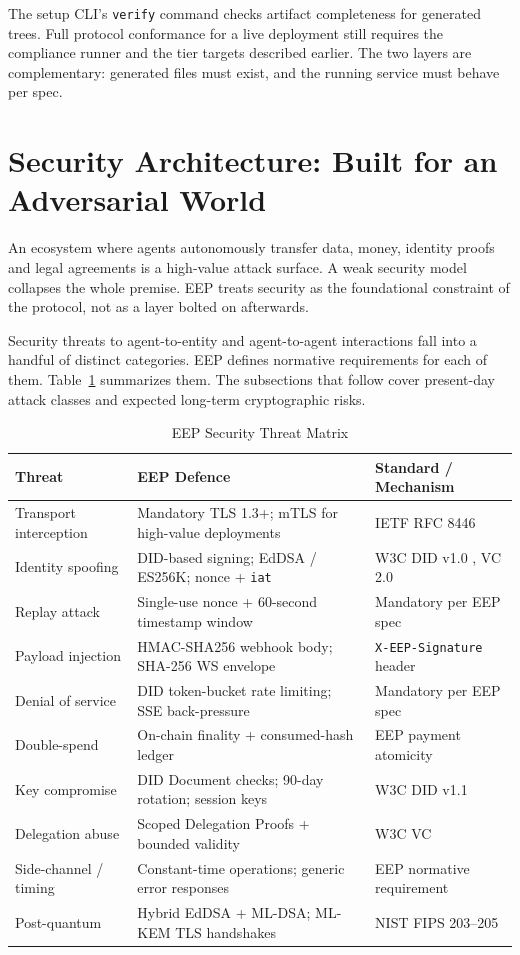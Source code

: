 \documentclass[12pt,a4paper]{article}
\begin{document}
The setup CLI's \texttt{verify} command checks artifact completeness for generated trees. Full protocol conformance for a live deployment still requires the compliance runner and the tier targets described earlier. The two layers are complementary: generated files must exist, and the running service must behave per spec.

\section{Security Architecture: Built for an Adversarial World}

An ecosystem where agents autonomously transfer data, money, identity proofs and legal agreements is a high-value attack surface. A weak security model collapses the whole premise. EEP treats security as the foundational constraint of the protocol, not as a layer bolted on afterwards.

Security threats to agent-to-entity and agent-to-agent interactions fall into a handful of distinct categories. EEP defines normative requirements for each of them. Table~\ref{tab:security} summarizes them. The subsections that follow cover present-day attack classes and expected long-term cryptographic risks.

\begin{table}[h!]
\centering
\caption{EEP Security Threat Matrix}
\label{tab:security}
\renewcommand{\arraystretch}{1.3}
\begin{tabular}{|p{3.3cm}|p{5.3cm}|p{6.0cm}|}
\hline
\textbf{Threat} & \textbf{EEP Defence} & \textbf{Standard / Mechanism} \\
\hline
Transport interception & Mandatory TLS 1.3+; mTLS for high-value deployments & IETF RFC 8446 \\
\hline
Identity spoofing & DID-based signing; EdDSA / ES256K; nonce + \texttt{iat} & W3C DID v1.0 \cite{ref5}, VC 2.0 \cite{ref10} \\
\hline
Replay attack & Single-use nonce + 60-second timestamp window & Mandatory per EEP spec \\
\hline
Payload injection & HMAC-SHA256 webhook body; SHA-256 WS envelope & \texttt{X-EEP-Signature} header \\
\hline
Denial of service & DID token-bucket rate limiting; SSE back-pressure & Mandatory per EEP spec \\
\hline
Double-spend & On-chain finality + consumed-hash ledger & EEP payment atomicity \\
\hline
Key compromise & DID Document checks; 90-day rotation; session keys & W3C DID v1.1 \cite{ref24} \\
\hline
Delegation abuse & Scoped Delegation Proofs + bounded validity & W3C VC \cite{ref10} \\
\hline
Side-channel / timing & Constant-time operations; generic error responses & EEP normative requirement \\
\hline
Post-quantum & Hybrid EdDSA + ML-DSA; ML-KEM TLS handshakes & NIST FIPS 203--205 \cite{ref11,ref12,ref13} \\
\hline
\end{tabular}
\end{table}
\end{document}
